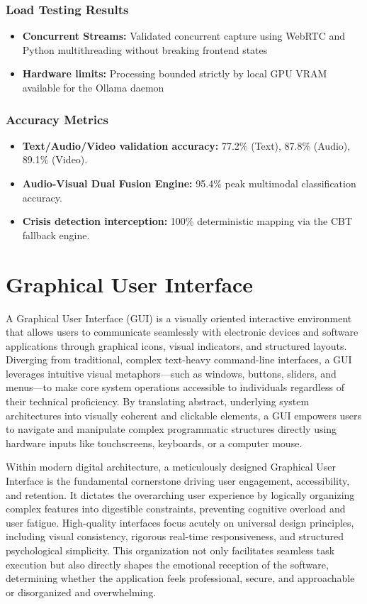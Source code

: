 \documentclass[11pt]{report}
\begin{document}
\subsection{Load Testing Results}
\begin{itemize}
    \item \textbf{Concurrent Streams:} Validated concurrent capture using WebRTC and Python multithreading without breaking frontend states
    \item \textbf{Hardware limits:} Processing bounded strictly by local GPU VRAM available for the Ollama daemon
\end{itemize}

\subsection{Accuracy Metrics}
\begin{itemize}
    \item \textbf{Text/Audio/Video validation accuracy:} 77.2\% (Text), 87.8\% (Audio), 89.1\% (Video).
    \item \textbf{Audio-Visual Dual Fusion Engine:} 95.4\% peak multimodal classification accuracy.
    \item \textbf{Crisis detection interception:} 100\% deterministic mapping via the CBT fallback engine.
\end{itemize}

\chapter{Graphical User Interface}
A Graphical User Interface (GUI) is a visually oriented interactive environment that allows users to communicate seamlessly with electronic devices and software applications through graphical icons, visual indicators, and structured layouts. Diverging from traditional, complex text-heavy command-line interfaces, a GUI leverages intuitive visual metaphors—such as windows, buttons, sliders, and menus—to make core system operations accessible to individuals regardless of their technical proficiency. By translating abstract, underlying system architectures into visually coherent and clickable elements, a GUI empowers users to navigate and manipulate complex programmatic structures directly using hardware inputs like touchscreens, keyboards, or a computer mouse.

Within modern digital architecture, a meticulously designed Graphical User Interface is the fundamental cornerstone driving user engagement, accessibility, and retention. It dictates the overarching user experience by logically organizing complex features into digestible constraints, preventing cognitive overload and user fatigue. High-quality interfaces focus acutely on universal design principles, including visual consistency, rigorous real-time responsiveness, and structured psychological simplicity. This organization not only facilitates seamless task execution but also directly shapes the emotional reception of the software, determining whether the application feels professional, secure, and approachable or disorganized and overwhelming.
\end{document}
